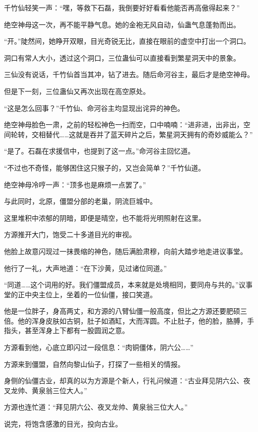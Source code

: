 \begin{this_body}
千竹仙轻笑一声：“嘿，等救下石磊，我倒要好好看看他能否再高傲得起来？”

绝空神母这一次，再不能平静气息。她的金袍无风自动，仙蛊气息蓬勃而出。

“开。”陡然间，她睁开双眼，目光奇锐无比，直接在眼前的虚空中打出一个洞口。

洞口有常人大小，透过这个洞口，三位蛊仙可以直接看到繁星洞天中的景象。

三仙没有说话，千竹仙首当其冲，钻了进去。随后命河谷主，最后才是绝空神母。

但是下一刻，三位蛊仙又再次出现在高空原处。

“这是怎么回事？”千竹仙、命河谷主均显现出诧异的神色。

绝空神母脸色一肃，之前的轻松神色一扫而空，口中喃喃：“进非进，出非出，空间轮转，交相替代……这就是吞并了蓝天碎片之后，繁星洞天拥有的奇妙威能么？”

“是了。石磊在求援信中，也提到了这一点。”命河谷主回忆道。

“不过也不奇怪，能够困住这只猴子的，又岂会简单？”千竹仙道。

绝空神母冷哼一声：“顶多也是麻烦一点罢了。”

与此同时，北原，僵盟分部的老巢，阴流巨城中。

这里堆积中浓郁的阴暗，即便是晴空，也不能将光明照射在这里。

方源推开大门，饱受二十多道目光的审视。

他脸上故意闪现过一抹畏缩的神色，随后满脸肃穆，向前大踏步地走进议事堂。

他行了一礼，大声地道：“在下沙黄，见过诸位同道。”

“同道……这个词用的好。我们僵盟成员，本来就是处境相同，要同舟与共的。”议事堂的正中央主位上，坐着的一位仙僵，接口笑道。

他是一位胖子，身高两丈，和方源的八臂仙僵一般高度，但比之方源还要肥硕三倍。他的浑身皮肤如古铜，肚子如酒缸，大而浑圆。不止肚子，他的脸，胳膊，手指头，甚至浑身上下都有一股圆润之意。

方源看到他，心底立即闪过一段信息：“肉铜僵体，阴六公……”

方源来到僵盟，自然向黎山仙子，打探了一些相关的情报。

身侧的仙僵古业，却真的以为方源是个新人，行礼问候道：“古业拜见阴六公、夜叉龙帅、黄泉翁三位大人。”

方源也连忙道：“拜见阴六公、夜叉龙帅、黄泉翁三位大人。”

说完，将饱含感激的目光，投向古业。


\end{this_body}
